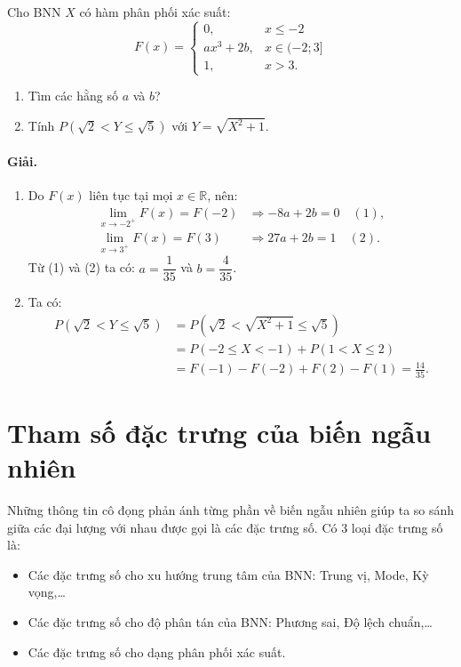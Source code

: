 \begin{vidu}[VD 6]
Cho BNN $X$ có hàm phân phối xác suất:
\[
F(x) = \begin{cases}
0, & x \le -2 \\
ax^3 + 2b, & x \in (-2; 3] \\
1, & x > 3.
\end{cases}
\]
\begin{enumerate}[label=\arabic*)]
    \item Tìm các hằng số $a$ và $b$?
    \item Tính $P(\sqrt{2} < Y \le \sqrt{5})$ với $Y = \sqrt{X^2 + 1}$.
\end{enumerate}

\paragraph{Giải.}
\begin{enumerate}[label=\arabic*)]
    \item Do $F(x)$ liên tục tại mọi $x \in \mathbb{R}$, nên:
    \begin{align*}
    \lim_{x \to -2^+} F(x) = F(-2) &\Rightarrow -8a + 2b = 0 \quad (1), \\
    \lim_{x \to 3^+} F(x) = F(3) &\Rightarrow 27a + 2b = 1 \quad (2).
    \end{align*}
    Từ (1) và (2) ta có: $a = \dfrac{1}{35}$ và $b = \dfrac{4}{35}$.

    \item Ta có:
    \begin{align*}
    P(\sqrt{2} < Y \le \sqrt{5}) &= P\left(\sqrt{2} < \sqrt{X^2 + 1} \le \sqrt{5}\right) \\
    &= P(-2 \le X < -1) + P(1 < X \le 2) \\
    &= F(-1) - F(-2) + F(2) - F(1) = \frac{14}{35}.
    \end{align*}
\end{enumerate}
\end{vidu}

\section{Tham số đặc trưng của biến ngẫu nhiên}

Những thông tin cô đọng phản ánh từng phần về biến ngẫu nhiên giúp ta so sánh giữa các đại lượng với nhau được gọi là các đặc trưng số. Có 3 loại đặc trưng số là:
\begin{itemize}
    \item Các đặc trưng số cho xu hướng trung tâm của BNN: Trung vị, Mode, Kỳ vọng,\dots
    \item Các đặc trưng số cho độ phân tán của BNN: Phương sai, Độ lệch chuẩn,\dots
    \item Các đặc trưng số cho dạng phân phối xác suất.
\end{itemize}

